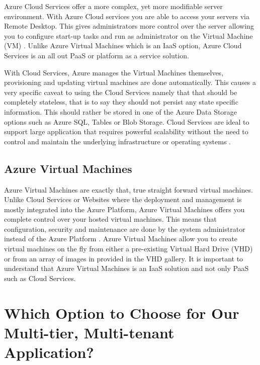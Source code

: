 Azure Cloud Services offer a more complex, yet more modifiable server environment. With Azure Cloud services you are able to access your servers via Remote Desktop. This gives administrators more control over the server allowing you to configure start-up tasks and run as administrator on the Virtual Machine (VM) \cite{Microsoft_Corporation2014-gg}. Unlike Azure Virtual Machines which is an IaaS option, Azure Cloud Services is an all out PaaS  or platform as a service solution.
 
With Cloud Services, Azure manages the Virtual Machines themselves, provisioning and updating virtual machines are done automatically. This causes a very specific caveat to using the Cloud Services namely that that should be completely stateless, that is to say they should not persist any state specific information. This should rather be stored in one of the Azure Data Storage options such as Azure SQL, Tables or Blob Storage. Cloud Services are ideal to support large application that requires powerful scalability without the need to control and maintain the underlying infrastructure or operating systems \cite{Microsoft_Corporation_undated-ej}.

\subsection{Azure Virtual Machines}

Azure Virtual Machines are exactly that, true straight forward virtual machines. Unlike Cloud Services or Websites where the deployment and management is mostly integrated into the Azure Platform, Azure Virtual Machines offers you complete control over your hosted virtual machines. This means that configuration, security and maintenance are done by the system administrator instead of the Azure Platform \cite{Microsoft_Corporation2014-gg}. Azure Virtual Machines allow you to create virtual machines on the fly from either a pre-existing Virtual Hard Drive (VHD) or from an array of images in provided in the VHD gallery. It is important to understand that Azure Virtual Machines is an IaaS solution and not only PaaS such as Cloud Services.

\section{Which Option to Choose for Our Multi-tier, Multi-tenant Application?}

